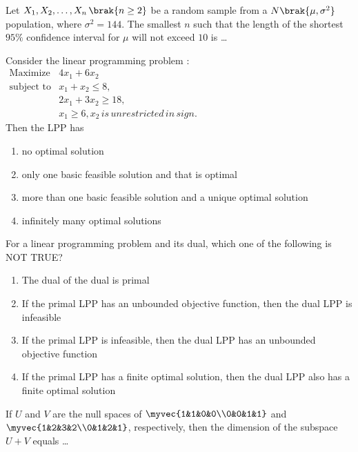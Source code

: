     \item Let $X_1,X_2,\dots,X_n\,\brak{n\geq2}$ be a random sample from a $N\brak{\mu,\sigma^2}$ population, where $\sigma^2=144.$ The smallest $n$ such that the length of the shortest $95\%$ confidence interval for $\mu$ will not exceed $10$ is \dots
    \item Consider the linear programming problem $\colon$
    $  \begin{array}{lc}
\text{Maximize} & 4x_1+6x_2 \\
\text{subject to} & x_1+x_2\leq 8, \\
& 2x_1+3x_2\geq 18, \\
& x_1\geq6,x_2 \,is\,unrestricted\,in\,sign.
\end{array} $ \\
Then the LPP has
    \begin{enumerate}
        \item no optimal solution 
        \item only one basic feasible solution and that is optimal 
        \item more than one basic feasible solution and a unique optimal solution
        \item infinitely many optimal solutions
    \end{enumerate}
    \item For a linear programming problem  and its dual, which one of the following is NOT TRUE?
    \begin{enumerate}
        \item The dual of the dual is primal
        \item If the primal LPP has an unbounded objective function, then the dual LPP is infeasible
        \item If the primal LPP is infeasible, then the dual LPP has an unbounded objective function
        \item If the primal LPP has a finite optimal solution, then the dual LPP also has a finite optimal solution
    \end{enumerate}
    \item If $U$ and $V$ are the null spaces of $\myvec{1&1&0&0\\0&0&1&1}$ and $\myvec{1&2&3&2\\0&1&2&1}$, respectively, then the dimension of the subspace $U+V$ equals \dots
